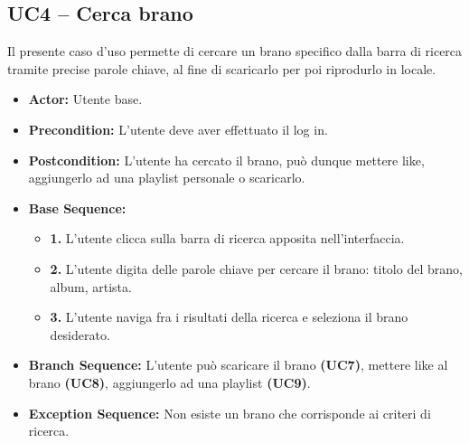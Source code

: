 \subsection{\textbf{UC4 -- Cerca brano}}
Il presente caso d'uso permette di cercare un brano specifico dalla barra di ricerca
tramite precise parole chiave, al fine di scaricarlo per poi riprodurlo in locale.
\begin{itemize}
    \item \textbf{Actor:} Utente base.
    \item \textbf{Precondition:} L'utente deve aver effettuato il log in.
    \item \textbf{Postcondition:} L'utente ha cercato il brano, può dunque mettere like, aggiungerlo ad una playlist personale o scaricarlo.
    \item \textbf{Base Sequence:}
    \begin{itemize}
        \item \textbf{1.} L'utente clicca sulla barra di ricerca apposita nell'interfaccia.
        \item \textbf{2.} L'utente digita delle parole chiave per cercare il brano: titolo del brano, album, artista.
        \item \textbf{3.} L'utente naviga fra i risultati della ricerca e seleziona il brano desiderato.
    \end{itemize}
    \item \textbf{Branch Sequence:} L'utente può scaricare il brano \textbf{(UC7)}, mettere like al brano \textbf{(UC8)}, aggiungerlo ad una playlist \textbf{(UC9)}.
    \item \textbf{Exception Sequence:} Non esiste un brano che corrisponde ai criteri di ricerca.
\end{itemize}

\vspace{0.5cm}
